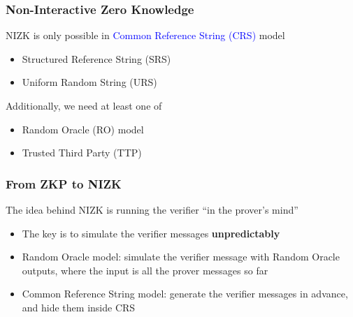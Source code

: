 \documentclass[handout]{beamer} %
\newcommand{\blue}[1]{\textcolor{blue}{#1}}
\begin{document}
\frame
{
  \frametitle{Non-Interactive Zero Knowledge}
  \onslide<+-> NIZK is only possible in \blue{Common Reference String (CRS)} model
  \begin{itemize}
    \item<+-> Structured Reference String (SRS)
    \item<+-> Uniform Random String (URS)
  \end{itemize}
  \onslide<+-> Additionally, we need at least one of
  \begin{itemize}
    \item<+-> Random Oracle (RO) model
    \item<+-> Trusted Third Party (TTP)
  \end{itemize}

%
%
}

{
  \frametitle{From ZKP to NIZK}

  \onslide<+-> The idea behind NIZK is running the verifier ``in the prover's mind''

  \begin{itemize}
    \item<+-> The key is to simulate the verifier messages \textbf{unpredictably}
    \item<+-> Random Oracle model: simulate the verifier message with Random Oracle outputs, where the input is all the prover messages so far
    \item<+-> Common Reference String model: generate the verifier messages in advance, and hide them inside CRS
  \end{itemize}
}

\end{document}
